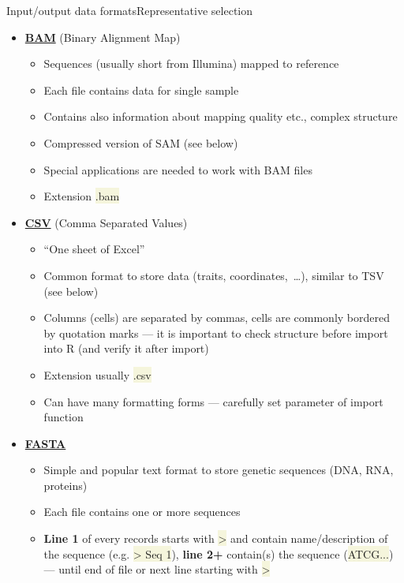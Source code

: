 \documentclass[compress, ucs, xelatex, 11pt, xcolor=svgnames, aspectratio=169,
	hyperref={
		bookmarks=true,
		unicode=true,
		colorlinks=true,
		pdftitle={Molecular data in R},
		plainpages=false,
		pdfauthor={Vojtech Zeisek},
		pdfsubject={Course about phylogeny and evolution in R},
		pdfcreator={XeLaTeX},
		pdfkeywords={R, evolution, phylogeny, molecular data},
		linkcolor=Crimson, %
		anchorcolor=Magenta, %
		citecolor=Magenta, %
		filecolor=Magenta, %
		menucolor=Magenta, %
		urlcolor=DodgerBlue, %
		pdftex},
	url={hyphens, lowtilde} %
	]{beamer}
\renewcommand{\texttt}[1]{\colorbox{Beige}{{\ttfamily #1}}}
\begin{document}
\begin{frame}[allowframebreaks]{Input/output data formats}{Representative selection}
	\begin{itemize}
		\item \href{https://en.wikipedia.org/wiki/Binary_Alignment_Map}{\textbf{BAM}} (Binary Alignment Map)
		\begin{itemize}
			\item Sequences (usually short from Illumina) mapped to reference
			\item Each file contains data for single sample
			\item Contains also information about mapping quality etc., complex structure
			\item Compressed version of SAM (see below)
			\item Special applications are needed to work with BAM files
			\item Extension \texttt{*.bam}
		\end{itemize}
		\item \href{https://en.wikipedia.org/wiki/Comma-separated_values}{\textbf{CSV}} (Comma Separated Values)
		\begin{itemize}
			\item \enquote{One sheet of Excel}
			\item Common format to store data (traits, coordinates,~\ldots), similar to TSV (see below)
			\item Columns (cells) are separated by commas, cells are commonly bordered by quotation marks --- it is important to check structure before import into R (and verify it after import)
			\item Extension usually \texttt{*.csv}
			\item Can have many formatting forms --- carefully set parameter of import function
		\end{itemize}
		\item \href{https://en.wikipedia.org/wiki/FASTA_format}{\textbf{FASTA}}
		\begin{itemize}
			\item Simple and popular text format to store genetic sequences (DNA, RNA, proteins)
			\item Each file contains one or more sequences
			\item \textbf{Line 1} of every records starts with \texttt{>} and contain name/description of the sequence (e.g. \texttt{> Seq 1}), \textbf{line 2+} contain(s) the sequence (\texttt{ATCG...}) --- until end of file or next line starting with \texttt{>}

\end{itemize}
\end{itemize}
\end{frame}
\end{document}
